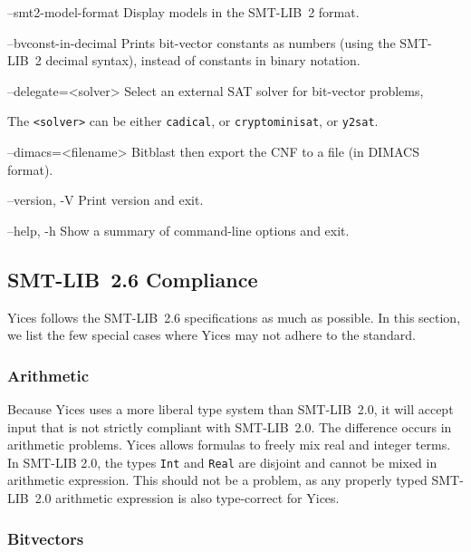 \documentclass[11pt,twoside,fleqn,openright,titlepage]{cslreport}
\newenvironment{options}{
\begin{list}{}{
\setlength{\labelsep}{1.8ex}
\setlength{\labelwidth}{0pt}
\setlength{\itemindent}{-0.5\leftmargin}
\settowidth{\leftmargin}{\texttt{--}}
\renewcommand{\makelabel}{\optionlabel}}}
{\end{list}}
\newcommand*\optionlabel[1]{\hspace\labelsep\texttt{#1}}
\begin{document}
\begin{options}
\item[--smt2-model-format] Display models in the SMT-LIB~2 format.

\item[--bvconst-in-decimal] Prints bit-vector constants as numbers
  (using the SMT-LIB~2 decimal syntax), instead of constants in binary
  notation.

\item[--delegate=<solver>] Select an external SAT solver for bit-vector problems,

   The \texttt{<solver>} can be either \texttt{cadical}, or \texttt{cryptominisat}, or \texttt{y2sat}.

\item[--dimacs=<filename>] Bitblast then export the CNF to a file (in DIMACS format).

\item[--version, -V] Print version and exit.

\item[--help, -h] Show a summary of command-line options and exit.

\end{options}


\subsection{SMT-LIB~2.6 Compliance}

Yices follows the SMT-LIB~2.6 specifications as much as possible. In
this section, we list the few special cases where Yices may not adhere
to the standard.

\subsubsection*{Arithmetic}

Because Yices uses a more liberal type system than SMT-LIB~2.0, it
will accept input that is not strictly compliant with SMT-LIB~2.0. The
difference occurs in arithmetic problems. Yices allows formulas to
freely mix real and integer terms. In SMT-LIB 2.0, the types
\texttt{Int} and \texttt{Real} are disjoint and cannot be mixed in
arithmetic expression. This should not be a problem, as any properly
typed SMT-LIB~2.0 arithmetic expression is also type-correct for
Yices.


\subsubsection*{Bitvectors}
\end{document}

